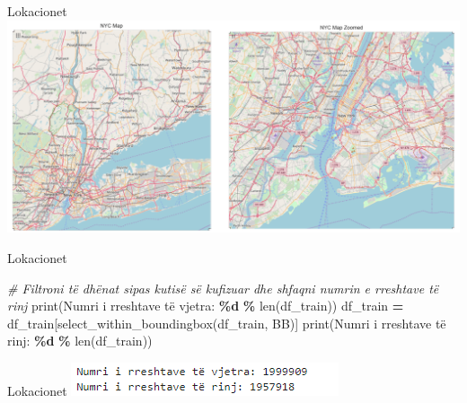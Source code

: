 \documentclass[
  ignorenonframetext,
]{beamer}
\newenvironment{Shaded}{\begin{snugshade}}{\end{snugshade}}
\newcommand{\BuiltInTok}[1]{#1}
\newcommand{\CommentTok}[1]{\textcolor[rgb]{0.56,0.35,0.01}{\textit{#1}}}
\newcommand{\NormalTok}[1]{#1}
\newcommand{\OperatorTok}[1]{\textcolor[rgb]{0.81,0.36,0.00}{\textbf{#1}}}
\newcommand{\SpecialCharTok}[1]{\textcolor[rgb]{0.81,0.36,0.00}{\textbf{#1}}}
\newcommand{\StringTok}[1]{\textcolor[rgb]{0.31,0.60,0.02}{#1}}
\begin{document}
\begin{frame}{Lokacionet}
\protect\hypertarget{lokacionet-7}{}
\includegraphics{./Figs/train9.png}
\end{frame}

\begin{frame}[fragile]{Lokacionet}
\protect\hypertarget{lokacionet-8}{}

\begin{Shaded}
\begin{Highlighting}[]
\CommentTok{\# Filtroni të dhënat sipas kutisë së kufizuar dhe shfaqni numrin e rreshtave të rinj}
\BuiltInTok{print}\NormalTok{(}\StringTok{\textquotesingle{}Numri i rreshtave të vjetra: }\SpecialCharTok{\%d}\StringTok{\textquotesingle{}} \OperatorTok{\%} \BuiltInTok{len}\NormalTok{(df\_train))}
\NormalTok{df\_train }\OperatorTok{=}\NormalTok{ df\_train[select\_within\_boundingbox(df\_train, BB)]}
\BuiltInTok{print}\NormalTok{(}\StringTok{\textquotesingle{}Numri i rreshtave të rinj: }\SpecialCharTok{\%d}\StringTok{\textquotesingle{}} \OperatorTok{\%} \BuiltInTok{len}\NormalTok{(df\_train))}
\end{Highlighting}
\end{Shaded}
\end{frame}

\begin{frame}{Lokacionet}
\protect\hypertarget{lokacionet-9}{}
\includegraphics{./Figs/train10.png}
\end{frame}
\end{document}
